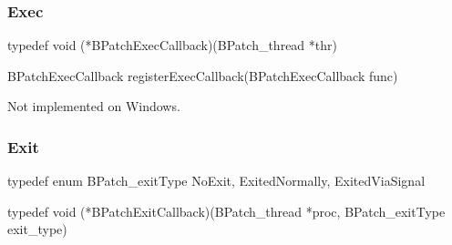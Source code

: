 \subsubsection{Exec}

\begin{apient}
typedef void (*BPatchExecCallback)(BPatch_thread *thr)
\end{apient}

\begin{apient}
BPatchExecCallback registerExecCallback(BPatchExecCallback func)
\end{apient}

\begin{apidesc}
Not implemented on Windows.
\end{apidesc}

\subsubsection{Exit}

\begin{apient}
typedef enum BPatch_exitType { NoExit, ExitedNormally, ExitedViaSignal }
\end{apient}

\begin{apient}
typedef void (*BPatchExitCallback)(BPatch_thread *proc, BPatch_exitType exit_type)
\end{apient}

